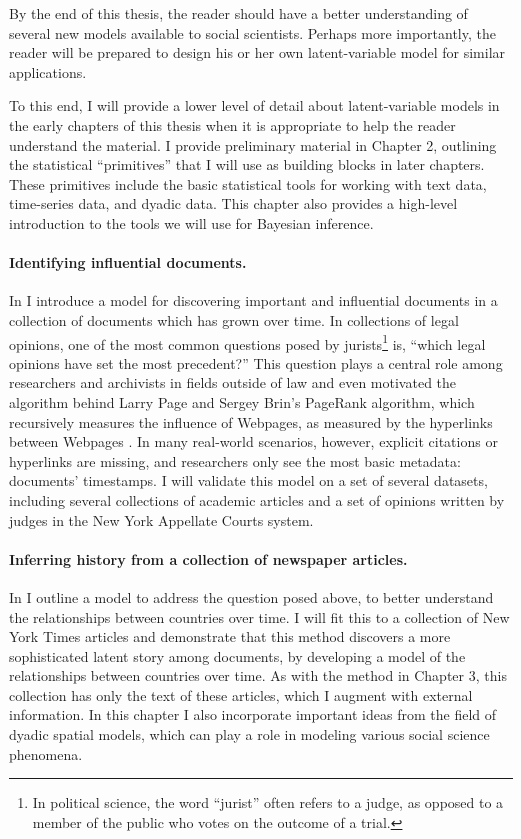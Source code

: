 By the end of this thesis, the reader should have a better
understanding of several new models available to social scientists.
Perhaps more importantly, the reader will be prepared to design his or
her own latent-variable model for similar applications.

To this end, I will provide a lower level of detail about
latent-variable models in the early chapters of this thesis when it is
appropriate to help the reader understand the material.  I provide
preliminary material in Chapter 2, outlining the statistical
``primitives'' that I will use as building blocks in later chapters.
These primitives include the basic statistical tools for working with
text data, time-series data, and dyadic data.  This chapter also
provides a high-level introduction to the tools we will use for
Bayesian inference.

\paragraph{Identifying influential documents.} In  I
introduce a model for discovering important and influential documents
in a collection of documents which has grown over time.  In
collections of legal opinions, one of the most common questions posed
by jurists\footnote{In political science, the word ``jurist'' often
  refers to a judge, as opposed to a member of the public who votes on
  the outcome of a trial.} is, ``which legal opinions have set the
most precedent?''  This question plays a central role among
researchers and archivists in fields outside of law and even motivated
the algorithm behind Larry Page and Sergey Brin's PageRank algorithm,
which recursively measures the influence of Webpages, as measured by
the hyperlinks between Webpages
\cite{garfield:1992,brin:1998,garfield:2002}.  In many real-world
scenarios, however, explicit citations or hyperlinks are missing, and
researchers only see the most basic metadata: documents' timestamps.
I will validate this model on a set of several datasets, including
several collections of academic articles and a set of opinions written
by judges in the New York Appellate Courts system.

\paragraph{Inferring history from a collection of newspaper articles.}
In  I outline a model to address the question
posed above, to better understand the relationships between countries
over time.  I will fit this to a collection of New York Times articles
and demonstrate that this method discovers a more sophisticated latent
story among documents, by developing a model of the relationships
between countries over time.  As with the method in Chapter 3, this
collection has only the text of these articles, which I augment with
external information.  In this chapter I also incorporate important
ideas from the field of dyadic spatial models, which can play a role
in modeling various social science phenomena.

